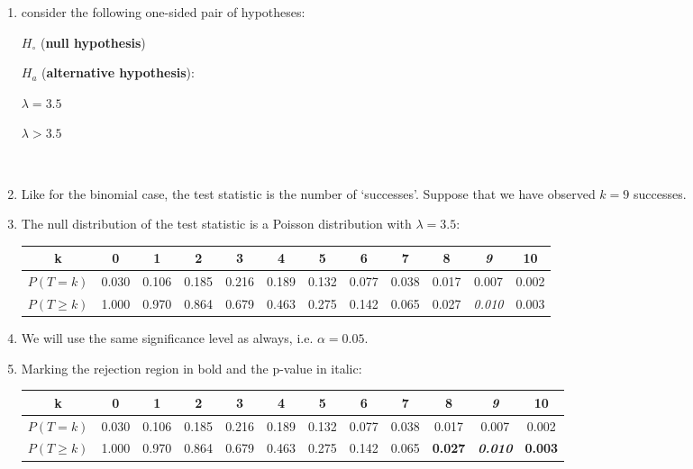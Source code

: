 \begin{enumerate}
\item consider the following one-sided pair of hypotheses:

  \noindent\begin{minipage}{.4\textwidth}
    $H_\circ$ (\textbf{null hypothesis})
    
    \vspace{1em}
    
    $H_a$ (\textbf{alternative hypothesis}):
  \end{minipage}
  \begin{minipage}{.2\textwidth}
  \end{minipage}
  \begin{minipage}{.2\textwidth}
    $\lambda = 3.5$
    
    \vspace{1em}
    
    $\lambda>{3.5}$
  \end{minipage}
  \begin{minipage}{.2\textwidth}
  \end{minipage}\\

\item Like for the binomial case, the test statistic is the number of
  `successes'.  Suppose that we have observed $k=9$ successes.

\item The null distribution of the test statistic is a Poisson
  distribution with $\lambda={3.5}$:
  
  \begin{tabular}{c@{~}c@{~}c@{~}c@{~}c@{~}c@{~}c@{~}c@{~}c@{~}c@{~}c@{~}c}
    k & 0 & 1 & 2 & 3 & 4 & 5 & 6 & 7 & 8 & \textit{9} & 10 \\ \hline
    $P(T=k)$ & 0.030 & 0.106 & 0.185 & 0.216 & 0.189 &
    0.132 & 0.077 & 0.038 & 0.017 & 0.007 & 0.002 \\
    $P({T}\geq{k})$ & 1.000 & 0.970 & 0.864 & 0.679 & 0.463 &
    0.275 & 0.142 & 0.065 & 0.027 & \textit{0.010} & 0.003 \\
  \end{tabular}

\item We will use the same significance level as always,
  i.e. $\alpha=0.05$.

\item Marking the rejection region in bold and the p-value in italic:

  \begin{tabular}{c@{~}c@{~}c@{~}c@{~}c@{~}c@{~}c@{~}c@{~}c@{~}c@{~}c@{~}c}
    k & 0 & 1 & 2 & 3 & 4 & 5 & 6 & 7 & \textbf{8} &
    \textbf{\textit{9}} & \textbf{10} \\ \hline
    $P(T=k)$ & 0.030 & 0.106 & 0.185 & 0.216 & 0.189 &
    0.132 & 0.077 & 0.038 & 0.017 & 0.007 & 0.002 \\
    $P({T}\geq{k})$ & 1.000 & 0.970 & 0.864 & 0.679 & 0.463 &
    0.275 & 0.142 & 0.065 & \textbf{0.027} & \textbf{\textit{0.010}} &
    \textbf{0.003} \\
  \end{tabular}


\end{enumerate}
